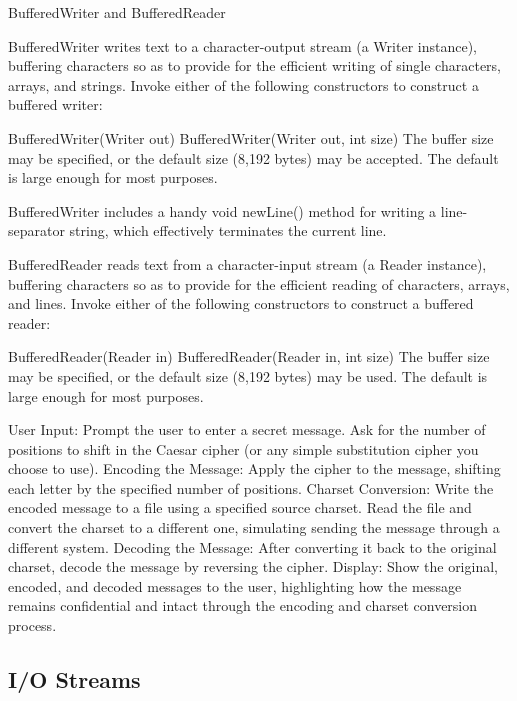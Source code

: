 BufferedWriter and BufferedReader

BufferedWriter writes text to a character-output stream (a Writer instance), buffering characters so as to provide for the efficient writing of single characters, arrays, and strings. Invoke either of the following constructors to construct a buffered writer:

BufferedWriter(Writer out)
BufferedWriter(Writer out, int size)
The buffer size may be specified, or the default size (8,192 bytes) may be accepted. The default is large enough for most purposes.

BufferedWriter includes a handy void newLine() method for writing a line-separator string, which effectively terminates the current line.

BufferedReader reads text from a character-input stream (a Reader instance), buffering characters so as to provide for the efficient reading of characters, arrays, and lines. Invoke either of the following constructors to construct a buffered reader:

BufferedReader(Reader in)
BufferedReader(Reader in, int size)
The buffer size may be specified, or the default size (8,192 bytes) may be used. The default is large enough for most purposes.

\begin{oefening}

User Input:
Prompt the user to enter a secret message.
Ask for the number of positions to shift in the Caesar cipher (or any simple substitution cipher you choose to use).
Encoding the Message:
Apply the cipher to the message, shifting each letter by the specified number of positions.
Charset Conversion:
Write the encoded message to a file using a specified source charset.
Read the file and convert the charset to a different one, simulating sending the message through a different system.
Decoding the Message:
After converting it back to the original charset, decode the message by reversing the cipher.
Display:
Show the original, encoded, and decoded messages to the user, highlighting how the message remains confidential and intact through the encoding and charset conversion process.

\end{oefening}

\subsection{I/O Streams}

